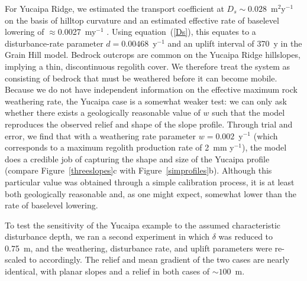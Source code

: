 \documentclass[esurf, manuscript]{copernicus}
\begin{document}
For Yucaipa Ridge, we estimated the transport coefficient at $D_s\sim0.028$~m$^2$y$^{-1}$ on the basis of hilltop curvature and an estimated effective rate of baselevel lowering of  $\approx$0.0027~my$^{-1}$ \citep{binnie2007tectonic}. Using equation~(\ref{Ds}), this equates to a disturbance-rate parameter $d=0.00468$~y$^{-1}$ and an uplift interval of 370~y in the Grain Hill model. Bedrock outcrops are common on the Yucaipa Ridge hillslopes, implying a thin, discontinuous regolith cover. We therefore treat the system as consisting of bedrock that must be weathered before it can become mobile. Because we do not have independent information on the effective maximum rock weathering rate, the Yucaipa case is a somewhat weaker test: we can only ask whether there exists a geologically reasonable value of $w$ such that the model reproduces the observed relief and shape of the slope profile. Through trial and error, we find that with a weathering rate parameter $w=0.002$~y$^{-1}$ (which corresponds to a maximum regolith production rate of 2~mm y$^{-1}$), the model does a credible job of capturing the shape and size of the Yucaipa profile (compare Figure~\ref{threeslopes}c with Figure~\ref{simprofiles}b). Although this particular value was obtained through a simple calibration process, it is at least both geologically reasonable and, as one might expect, somewhat lower than the rate of baselevel lowering.

To test the sensitivity of the Yucaipa example to the assumed characteristic disturbance depth, we ran a second experiment in which $\delta$ was reduced to 0.75~m, and the weathering, disturbance rate, and uplift parameters were re-scaled to accordingly. The relief and mean gradient of the two cases are nearly identical, with planar slopes and a relief in both cases of $\sim100$~m.



% 
% 
% 
% 
% 
% 
\end{document}
